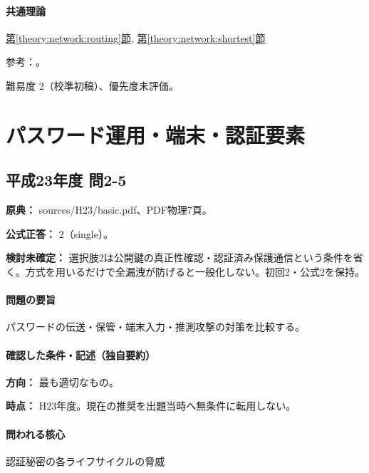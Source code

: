 \paragraph{共通理論} \hyperref[theory:network:routing]{第\ref*{theory:network:routing}節}, \hyperref[theory:network:shortest]{第\ref*{theory:network:shortest}節}

\par 参考：\cite{net_ospf,net_rip}。

\par 難易度 2（校準初稿）、優先度未評価。

\section{パスワード運用・端末・認証要素}

\subsection{平成23年度 問2-5}
\label{q:h23-reg-basic-2-5}

\noindent\textbf{原典：} sources/H23/basic.pdf、PDF物理7頁。

\textbf{公式正答：} 2（single）。

\par\textbf{検討未確定：} 選択肢2は公開鍵の真正性確認・認証済み保護通信という条件を省く。方式を用いるだけで全漏洩が防げると一般化しない。初回2・公式2を保持。

\paragraph{問題の要旨} パスワードの伝送・保管・端末入力・推測攻撃の対策を比較する。

\paragraph{確認した条件・記述（独自要約）}\mbox{}\par

\noindent\textbf{方向：} 最も適切なもの。\par

\noindent\textbf{時点：} H23年度。現在の推奨を出題当時へ無条件に転用しない。\par

\paragraph{問われる核心} 認証秘密の各ライフサイクルの脅威

